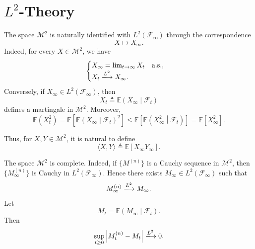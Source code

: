 
\section{\texorpdfstring{$L^2$}--Theory}

The space $\mathcal{M}^2$ is naturally identified with $L^2(\mathcal{F}_\infty)$ through the correspondence
$$
    X \longmapsto X_\infty.
$$
Indeed, for every $X \in \mathcal{M}^2$, we have
$$
\begin{cases}
    X_\infty = \lim_{t \to \infty} X_t \quad \text{a.s.},\\
    X_t \xlongrightarrow{L^2} X_\infty.
\end{cases}
$$
Conversely, if $X_\infty \in L^2(\mathcal{F}_\infty)$, then
$$
    X_t \triangleq \mathbb{E}\left( X_\infty \middle| \mathcal{F}_t \right)
$$
defines a martingale in $\mathcal{M}^2$. Moreover,
$$
    \mathbb{E}\left( X_t^2 \right)
    = \mathbb{E}\left[ \mathbb{E}\left( X_\infty \middle| \mathcal{F}_t \right)^2 \right]
    \leq \mathbb{E}\left[ \mathbb{E}\left( X_\infty^2 \middle| \mathcal{F}_t \right) \right]
    = \mathbb{E}[X_\infty^2].
$$

Thus, for $X,Y \in \mathcal{M}^2$, it is natural to define
$$
    \langle X,Y \rangle \triangleq \mathbb{E}\left[ X_{\infty}Y_{\infty} \right].
$$



The space $\mathcal{M}^2$ is complete. Indeed, if $\{M^{(n)}\}$ is a Cauchy sequence in $\mathcal{M}^2$, then $\{M_\infty^{(n)}\}$ is Cauchy in $L^2(\mathcal{F}_\infty)$. Hence there exists $M_\infty \in L^2(\mathcal{F}_\infty)$ such that
$$
    M_\infty^{(n)} \xlongrightarrow{L^2} M_\infty.
$$
Let
$$
    M_t = \mathbb{E}(M_\infty \mid \mathcal{F}_t).
$$
Then
$$
    \sup_{t \geq 0}\abs{ M_t^{(n)} - M_t } \xlongrightarrow{L^2} 0.
$$


